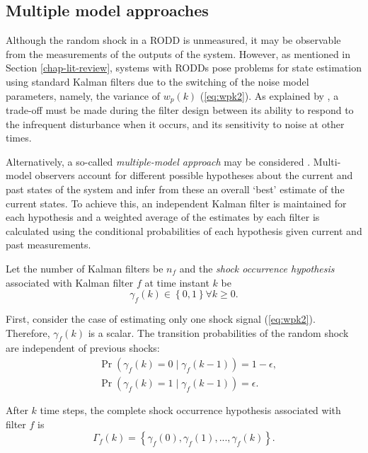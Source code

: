 \subsection{Multiple model approaches}

Although the random shock in a RODD is unmeasured, it may be observable from the measurements of the outputs of the system. However, as mentioned in Section \ref{chap-lit-review}, systems with RODDs pose problems for state estimation using standard Kalman filters due to the switching of the noise model parameters, namely, the variance of $w_p(k)$ (\ref{eq:wpk2}). As explained by \cite{robertson_detection_1995}, a trade-off must be made during the filter design between its ability to respond to the infrequent disturbance when it occurs, and its sensitivity to noise at other times.

Alternatively, a so-called \textit{multiple-model approach} may be considered \citep{buxbaum_recursive_1969, jaffer_estimation_1971}. Multi-model observers account for different possible hypotheses about the current and past states of the system and infer from these an overall `best' estimate of the current states. To achieve this, an independent Kalman filter is maintained for each hypothesis and a weighted average of the estimates by each filter is calculated using the conditional probabilities of each hypothesis given current and past measurements.

Let the number of Kalman filters be $n_f$ and the \textit{shock occurrence hypothesis} associated with Kalman filter $f$ at time instant $k$ be
\begin{equation} \label{eq:gammak}
	\gamma_{f}(k) \in \left\{0, 1 \right\} \forall{k \ge 0}.
\end{equation}

First, consider the case of estimating only one shock signal (\ref{eq:wpk2}). Therefore, $\gamma_{f}(k)$ is a scalar. The transition probabilities of the random shock are independent of previous shocks:
\begin{equation} \label{eq:Pr_gammak_given_gammakm1}
	\begin{aligned}
		& \Pr\left(\gamma_{f}(k)=0 \mid \gamma_{f}(k-1)\right) = 1-\epsilon, \\
		& \Pr\left(\gamma_{f}(k)=1 \mid \gamma_{f}(k-1)\right) = \epsilon.
	\end{aligned}
\end{equation}

After $k$ time steps, the complete shock occurrence hypothesis associated with filter $f$ is
\begin{equation} \label{eq:Gammak}
	\Gamma_f(k) = \left\{\gamma_f(0), \gamma_f(1), ..., \gamma_f(k) \right\}.
\end{equation}

